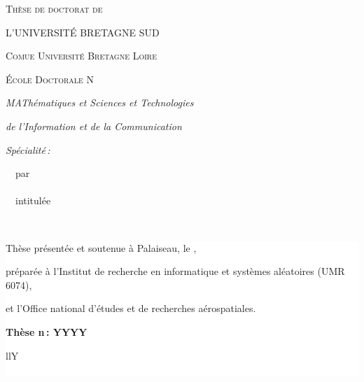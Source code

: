 {\begin{titlepage}
  {\selectfont
  {\Huge \scshape{Thèse de doctorat de}}\\

  \vspace*{0.068\paperheight}

  {\Large L'UNIVERSITÉ BRETAGNE SUD}

  \medskip

  {\large \scshape{Comue Université Bretagne Loire}}

  \medskip

  {\large \scshape{École Doctorale N}}

  \medskip

  \emph{MAThématiques et Sciences et Technologies}

  \emph{de l'Information et de la Communication}

  \emph{Spécialité\,: \@specialite}

        \medskip
        ~~par\\
        \medskip
        {\Huge\hspace{2cm} \textbf{~~~\@author}}\\

        \medskip
        ~~intitulée\\
        \medskip

        {\LARGE~~~\@title}

        \medskip
        \vspace*{0.01\paperheight}

        \colorbox{white}{\centering\begin{minipage}{0.9\textwidth}
        \medskip
        Thèse présentée et soutenue à Palaiseau, le \@date,

        préparée à l'Institut de recherche en informatique et systèmes aléatoires (UMR 6074),

        et l'Office national d'études et de recherches aérospatiales.

        \medskip
        \textbf{Thèse n\,: YYYY}

        \vspace*{0.03\paperheight}
        \begin{tabularx}{\textwidth}{llY}
          \\
          \\
          \@rapporteura
          \@rapporteurb
        \end{tabularx}

        \medskip


\end{minipage}}}
\end{titlepage}}
